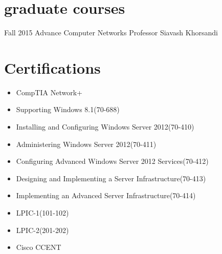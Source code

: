 \documentclass[]{friggeri-cv} %
\begin{document}

\section{graduate courses}

\begin{entrylist}

\entry
{Fall 2015}
{Advance Computer Networks}
{Professor Siavash Khorsandi}
{}


\end{entrylist}


\section{Certifications}
\begin{itemize}
	\item CompTIA Network+
	\item Supporting Windows 8.1(70-688)
	\item Installing and Configuring Windows Server 2012(70-410)
	\item Administering Windows Server 2012(70-411)
	\item Configuring Advanced Windows Server 2012 Services(70-412)
	\item Designing and Implementing a Server Infrastructure(70-413)
	\item Implementing an Advanced Server Infrastructure(70-414)
	\item LPIC-1(101-102)
	\item LPIC-2(201-202)
	\item Cisco CCENT
\end{itemize}


\end{document}
